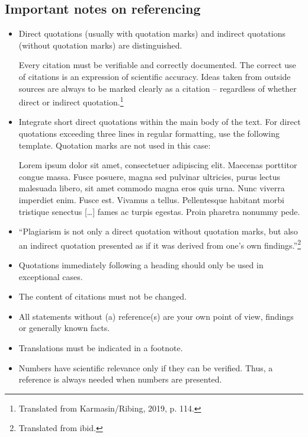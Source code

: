 \subsection{Important notes on referencing}
\begin{itemize}
	\item Direct quotations (usually with quotation marks) and indirect quotations (without quotation marks) are distinguished.
	\begin{addmargin}[10pt]{0pt}
		{\footnotesize Every citation must be verifiable and correctly documented. The correct use of citations is an expression of scientific accuracy. Ideas taken from outside sources are always to be marked clearly as a citation – regardless of whether direct or indirect quotation.\footnote{Translated from Karmasin/Ribing, 2019, p. 114.}}
	\end{addmargin} 
	\item Integrate short direct quotations within the main body of the text. For direct quotations exceeding three lines in regular formatting, use the following template. Quotation marks are not used in this case:
	\begin{addmargin}[10pt]{0pt}
		{\footnotesize Lorem ipsum dolor sit amet, consectetuer adipiscing elit. Maecenas porttitor congue massa. Fusce posuere, magna sed pulvinar ultricies, purus lectus malesuada libero, sit amet commodo magna eros quis urna. Nunc viverra imperdiet enim. Fusce est. Vivamus a tellus. Pellentesque habitant morbi tristique senectus [\dots] fames ac turpis egestas. Proin pharetra nonummy pede. \cite[p.~6]{Meier:Globalisierung}}
	\end{addmargin} 
	\item ``Plagiarism is not only a direct quotation without quotation marks, but also an indirect quotation presented as if it was derived from one’s own findings.''\footnote{Translated from ibid.}
	\item Quotations immediately following a heading should only be used in exceptional cases.
	\item The content of citations must not be changed.
	\item All statements without (a) reference(s) are your own point of view, findings or generally known facts.
	\item Translations must be indicated in a footnote.
	\item Numbers have scientific relevance only if they can be verified. Thus, a reference is always needed when numbers are presented.
\end{itemize}
